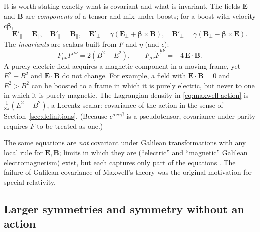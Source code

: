 \documentclass[11pt,a4paper,openany]{book}
\theoremstyle{definition}
\theoremstyle{plain}
\theoremstyle{remark}
\newcommand{\vE}{\bm{E}}
\newcommand{\vB}{\bm{B}}
\newcommand{\vbeta}{\bm{\beta}}
\begin{document}
It is worth stating exactly what is covariant and what is invariant.
The fields $\vE$ and $\vB$ are \emph{components} of a tensor and mix under
boosts; for a boost with velocity $c\vbeta$,
\begin{equation}\label{eq:boost-fields}
  \vE'_\parallel=\vE_\parallel,\quad \vB'_\parallel=\vB_\parallel,\quad
  \vE'_\perp=\gamma(\vE_\perp+\vbeta\times\vB),\quad
  \vB'_\perp=\gamma(\vB_\perp-\vbeta\times\vE).
\end{equation}
The \emph{invariants} are scalars built from $F$ and $\eta$ (and $\epsilon$):
\begin{equation}\label{eq:EM-invariants}
  F_{\mu\nu}F^{\mu\nu}=2(B^2-E^2),\qquad
  F_{\mu\nu}\tilde F^{\mu\nu}=-4\,\vE\!\cdot\!\vB .
\end{equation}
A purely electric field acquires a magnetic component in a moving frame, yet
$E^2-B^2$ and $\vE\!\cdot\!\vB$ do not change. For example, a field with
$\vE\!\cdot\!\vB=0$ and $E^2>B^2$ can be boosted to a frame in which it is
purely electric, but never to one in which it is purely magnetic. The
Lagrangian density in \eqref{eq:maxwell-action} is $\tfrac1{8\pi}(E^2-B^2)$, a
Lorentz scalar: covariance of the action in the sense of
Section~\ref{sec:definitions}. (Because $\epsilon^{\mu\nu\alpha\beta}$ is a
pseudotensor, covariance under parity requires $\tilde F$ to be treated as
one.)

The same equations are \emph{not} covariant under Galilean transformations
with any local rule for $\vE,\vB$; limits in which they are (``electric'' and
``magnetic'' Galilean electromagnetism) exist, but each captures only part of
the equations \cite{lbll}. The failure of Galilean covariance of Maxwell's
theory was the original motivation for special relativity.

\subsection{Larger symmetries and symmetry without an action}
\end{document}
